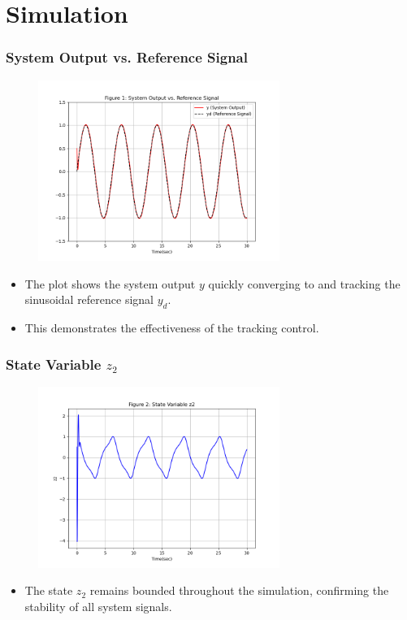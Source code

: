 \documentclass[18p]{beamer}
\begin{document}
\section{Simulation}
\begin{frame}
	\frametitle{System Output vs. Reference Signal}
	\vspace*{1\baselineskip}
			\begin{figure}[h!]
		\centering
		\includegraphics[width=0.70\textwidth]{./img/sim1.png}
	\end{figure}
		\begin{itemize}
		\item The plot shows the system output $y$ quickly converging to and tracking the sinusoidal reference signal $y_d$.
		\item This demonstrates the effectiveness of the tracking control.
	\end{itemize}
\end{frame}
\begin{frame}
	\frametitle{State Variable $z_2$}
	\vspace*{1\baselineskip}
		\begin{figure}[h!]
		\centering
		\includegraphics[width=0.70\textwidth]{./img/sim2.png}
	\end{figure}
	\begin{itemize}
		\item The state $z_2$ remains bounded throughout the simulation, confirming the stability of all system signals.
	\end{itemize}
\end{frame}
\end{document}
